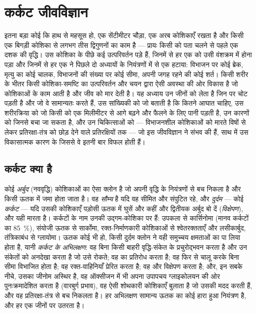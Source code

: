 \chapter{कर्कट जीवविज्ञान}\label{ch:b3:cancer-biology}

इतना बड़ा कोई  कि हाथ से महसूस हो, एक सेंटीमीटर चौड़ा, एक अरब
कोशिकाएँ रखता है और किसी एक बिगड़ी कोशिका से लगभग तीस द्विगुणनों का काम
है --- प्रायः किसी को पता चलने से पहले एक दशक की वृद्धि। उस कोशिका के
पीछे कई उत्परिवर्तन पड़े हैं, जिनमें से हर एक को उसी वंशक्रम में होना
पड़ा और जिनमें से हर एक ने पिछले दो अध्यायों के नियंत्रणों में से एक
हटाया: विभाजन पर कोई ब्रेक, मृत्यु का कोई चालक, विभाजनों की संख्या पर
कोई सीमा, अपनी जगह रहने की कोई शर्त।  किसी शरीर के भीतर किसी
कोशिका-समष्टि का उत्परिवर्तन और चयन द्वारा ऐसी अवस्था की ओर विकास है जो
कोशिकाओं के काम आती है और जीव को मार देती है। यह अध्याय उन जीनों को
लेता है जिन पर चोट पड़ती है और जो वे सामान्यतः करते हैं, उस सांख्यिकी
को जो बताती है कि कितने आघात चाहिए, उस शरीरक्रिया को जो किसी  को
एक मिलीमीटर से आगे बढ़ने और फैलने के लिए पानी पड़ती है, उन कारणों को
जिनसे बचा जा सकता है, और उन चिकित्साओं को --- विभाजनशील कोशिकाओं को
मारते विषों से लेकर प्रतिरक्षा-तंत्र को छोड़ देने वाले प्रतिरक्षियों
तक --- जो इस जीवविज्ञान ने संभव की हैं, साथ में उस विकासात्मक कारण के
जिससे वे इतनी बार विफल होती हैं।

\section{कर्कट क्या है}

\begin{definition}[अर्बुद, कर्कट, अभिलक्षण]\label{def:b3:cancer-biology:hallmarks}
कोई \emph{अर्बुद} (नववृद्धि) कोशिकाओं का ऐसा क्लोन है जो अपनी वृद्धि के
नियंत्रणों से बच निकला है और किसी ऊतक में जमा होता जाता है। वह
\emph{सौम्य} है यदि वह सीमित और संपुटित रहे, और \emph{दुर्दम} --- कोई
\emph{कर्कट} --- यदि उसकी कोशिकाएँ पड़ोसी ऊतक में घुसें और कहीं और
द्वितीयक अर्बुद बो दें (\emph{विक्षेपण}), और यही मारता है।
कर्कटों के नाम उनकी उद्गम-कोशिका पर हैं: उपकला से कार्सिनोमा
(मानव कर्कटों का \qty{85}{\%}), संयोजी ऊतक से सार्कोमा,
रक्त-निर्माणकारी कोशिकाओं से श्वेतरक्तताएँ और लसीकार्बुद, तंत्रिकाबंध से
ग्लायोमा। ऊतक कोई भी हो, किसी दुर्दम क्लोन ने वही समुच्चय
क्षमताओं का पा लिया होता है, यानी \emph{कर्कट के अभिलक्षण}: वह बिना
किसी बाहरी वृद्धि-संकेत के प्रचुरोद्भवन करता है और उन संकेतों को अनदेखा
करता है जो उसे रोकते; वह  का प्रतिरोध करता है; वह
 फिर से चालू करके बिना सीमा विभाजित होता है; वह रक्त-वाहिनियाँ
प्रेरित करता है; वह  और विक्षेपण करता है;
और, इन सबके नीचे, उसका जीनोम अस्थिर है, वह ऑक्सीजन में भी अपना उपापचय
ग्लाइकोलयन की ओर पुनःक्रमादेशित करता है (वारबुर्ग प्रभाव), वह ऐसी
शोथकारी कोशिकाएँ बुलाता है जो उसकी मदद करती हैं, और वह प्रतिरक्षा-तंत्र
से बच निकलता है। हर अभिलक्षण सामान्य ऊतक का कोई हारा हुआ नियंत्रण है,
और हर एक जीनों पर उतरता है।
\end{definition}

